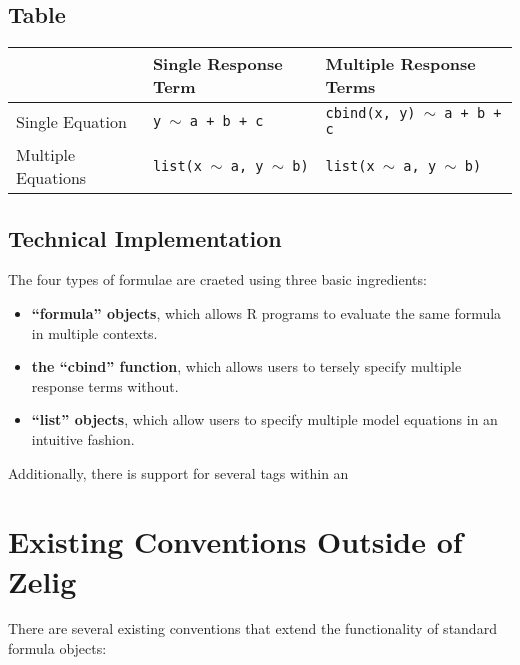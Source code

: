 \documentclass{article}
\newcommand{\tweedly}[0]{$\sim${ }}
\begin{document}
\subsection{Table}
{\noindent}\begin{tabular}{|l|l|l|}

  \hline

  & Single Response Term & Multiple Response Terms \\ \hline

  Single Equation &
  {\tt y \tweedly a + b + c} & {\tt cbind(x, y) \tweedly a + b + c}
  \\ \hline

  Multiple Equations & 
  {\tt list(x \tweedly a, y \tweedly b)} &
  {\tt list(x \tweedly a, y \tweedly b)} \\ \hline


\end{tabular}

\subsection{Technical Implementation}

The four types of formulae are craeted using three basic ingredients:

\begin{itemize}

  \item {\bf ``formula'' objects}, which allows R programs to evaluate the
    same formula in multiple contexts.

  \item {\bf the ``cbind'' function}, which allows users to tersely specify
    multiple response terms without.

  \item {\bf ``list'' objects}, which allow users to specify multiple
    model equations in an intuitive fashion.

\end{itemize}

Additionally, there is support for several tags within an



%
%
%
\section{Existing Conventions Outside of Zelig}
\label{sec:existing-elsewhere}

There are several existing conventions that extend the functionality of standard
formula objects:
\end{document}
